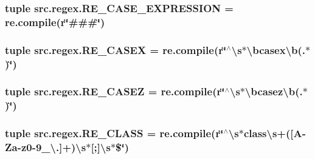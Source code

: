 \hypertarget{namespacesrc_1_1regex_a6505f86e33d213265d2382176cbc7a51}{
\subsubsection[{R\-E\-\_\-\-C\-A\-S\-E\-\_\-\-E\-X\-P\-R\-E\-S\-S\-I\-O\-N}]{\setlength{\rightskip}{0pt plus 5cm}tuple src.\-regex.\-R\-E\-\_\-\-C\-A\-S\-E\-\_\-\-E\-X\-P\-R\-E\-S\-S\-I\-O\-N = re.\-compile(r\char`\"{}\#\#\#\char`\"{})}}\label{namespacesrc_1_1regex_a6505f86e33d213265d2382176cbc7a51}
\hypertarget{namespacesrc_1_1regex_a50994b87d5e17a46ab1e8784784ddd11}{
\subsubsection[{R\-E\-\_\-\-C\-A\-S\-E\-X}]{\setlength{\rightskip}{0pt plus 5cm}tuple src.\-regex.\-R\-E\-\_\-\-C\-A\-S\-E\-X = re.\-compile(r\char`\"{}$^\wedge$\textbackslash{}s$\ast$\textbackslash{}bcasex\textbackslash{}b(.$\ast$)\char`\"{})}}\label{namespacesrc_1_1regex_a50994b87d5e17a46ab1e8784784ddd11}
\hypertarget{namespacesrc_1_1regex_a171b6ef72b3bf09efac126c2c1088b0b}{
\subsubsection[{R\-E\-\_\-\-C\-A\-S\-E\-Z}]{\setlength{\rightskip}{0pt plus 5cm}tuple src.\-regex.\-R\-E\-\_\-\-C\-A\-S\-E\-Z = re.\-compile(r\char`\"{}$^\wedge$\textbackslash{}s$\ast$\textbackslash{}bcasez\textbackslash{}b(.$\ast$)\char`\"{})}}\label{namespacesrc_1_1regex_a171b6ef72b3bf09efac126c2c1088b0b}
\hypertarget{namespacesrc_1_1regex_ae722982be3810457beb6591f1ad8786b}{
\subsubsection[{R\-E\-\_\-\-C\-L\-A\-S\-S}]{\setlength{\rightskip}{0pt plus 5cm}tuple src.\-regex.\-R\-E\-\_\-\-C\-L\-A\-S\-S = re.\-compile(r\char`\"{}$^\wedge$\textbackslash{}s$\ast$class\textbackslash{}s+(\mbox{[}A-\/Za-\/z0-\/9\-\_\-\textbackslash{}.\mbox{]}+)\textbackslash{}s$\ast$\mbox{[};\mbox{]}\textbackslash{}s$\ast$\$\char`\"{})}}\label{namespacesrc_1_1regex_ae722982be3810457beb6591f1ad8786b}
